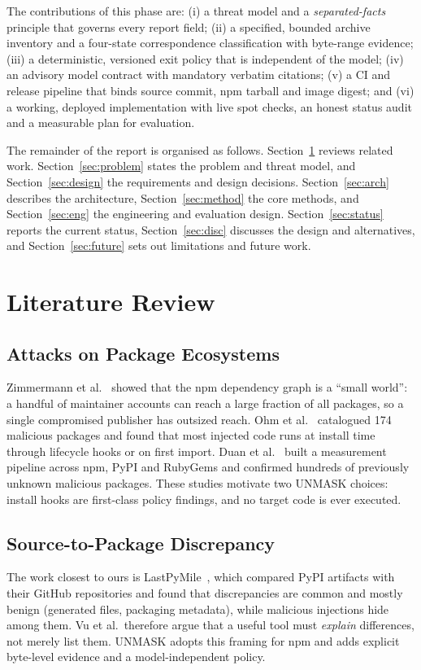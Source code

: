 \documentclass[conference]{IEEEtran}
\begin{document}
The contributions of this phase are: (i) a threat model and a
\emph{separated-facts} principle that governs every report field; (ii) a
specified, bounded archive inventory and a four-state correspondence
classification with byte-range evidence; (iii) a deterministic, versioned exit
policy that is independent of the model; (iv) an advisory model contract with
mandatory verbatim citations; (v) a CI and release pipeline that binds source
commit, npm tarball and image digest; and (vi) a working, deployed
implementation with live spot checks, an honest status audit and a measurable
plan for evaluation.

The remainder of the report is organised as follows. Section~\ref{sec:lit}
reviews related work. Section~\ref{sec:problem} states the problem and threat
model, and Section~\ref{sec:design} the requirements and design decisions.
Section~\ref{sec:arch} describes the architecture, Section~\ref{sec:method} the
core methods, and Section~\ref{sec:eng} the engineering and evaluation design.
Section~\ref{sec:status} reports the current status, Section~\ref{sec:disc}
discusses the design and alternatives, and Section~\ref{sec:future} sets out
limitations and future work.

\section{Literature Review}\label{sec:lit}

\subsection{Attacks on Package Ecosystems}
Zimmermann et al.~\cite{zimmermann2019} showed that the npm dependency graph is
a ``small world'': a handful of maintainer accounts can reach a large fraction
of all packages, so a single compromised publisher has outsized reach. Ohm et
al.~\cite{ohm2020} catalogued 174 malicious packages and found that most
injected code runs at install time through lifecycle hooks or on first import.
Duan et al.~\cite{duan2021} built a measurement pipeline across npm, PyPI and
RubyGems and confirmed hundreds of previously unknown malicious packages. These
studies motivate two UNMASK choices: install hooks are first-class policy
findings, and no target code is ever executed.

\subsection{Source-to-Package Discrepancy}
The work closest to ours is LastPyMile~\cite{vu2021}, which compared PyPI
artifacts with their GitHub repositories and found that discrepancies are
common and mostly benign (generated files, packaging metadata), while malicious
injections hide among them. Vu et al.\ therefore argue that a useful tool must
\emph{explain} differences, not merely list them. UNMASK adopts this framing for
npm and adds explicit byte-level evidence and a model-independent policy.
\end{document}
